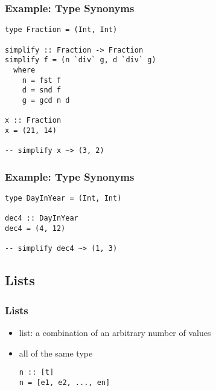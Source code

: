 \documentclass[dvipsnames]{beamer}
\theoremstyle{plain}
\begin{document}
\begin{frame}[fragile]
  \frametitle{Example: Type Synonyms}

  \begin{lstlisting}
type Fraction = (Int, Int)

simplify :: Fraction -> Fraction
simplify f = (n `div` g, d `div` g)
  where
    n = fst f
    d = snd f
    g = gcd n d

x :: Fraction
x = (21, 14)

-- simplify x ~> (3, 2)
  \end{lstlisting}
\end{frame}

\begin{frame}[fragile]
  \frametitle{Example: Type Synonyms}

  \begin{lstlisting}
type DayInYear = (Int, Int)

dec4 :: DayInYear
dec4 = (4, 12)

-- simplify dec4 ~> (1, 3)
  \end{lstlisting}
\end{frame}

\subsection{Lists}

\begin{frame}[fragile]
  \frametitle{Lists}

  \begin{itemize}
    \item \alert{list}: a combination of an arbitrary number of values
    \item all of the same type

    \smallskip
    \begin{lstlisting}[style=syntax]
n :: [t]
n = [e1, e2, ..., en]
    \end{lstlisting}
  \end{itemize}
\end{frame}
\end{document}
